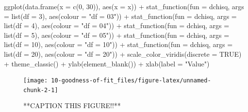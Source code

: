 \documentclass[
]{book}
\newenvironment{Shaded}{\begin{snugshade}}{\end{snugshade}}
\newcommand{\AttributeTok}[1]{\textcolor[rgb]{0.77,0.63,0.00}{#1}}
\newcommand{\ConstantTok}[1]{\textcolor[rgb]{0.00,0.00,0.00}{#1}}
\newcommand{\DecValTok}[1]{\textcolor[rgb]{0.00,0.00,0.81}{#1}}
\newcommand{\FunctionTok}[1]{\textcolor[rgb]{0.00,0.00,0.00}{#1}}
\newcommand{\NormalTok}[1]{#1}
\newcommand{\SpecialCharTok}[1]{\textcolor[rgb]{0.00,0.00,0.00}{#1}}
\newcommand{\StringTok}[1]{\textcolor[rgb]{0.31,0.60,0.02}{#1}}
\begin{document}
\begin{Shaded}
\begin{Highlighting}[]
\FunctionTok{ggplot}\NormalTok{(}\FunctionTok{data.frame}\NormalTok{(}\AttributeTok{x =} \FunctionTok{c}\NormalTok{(}\DecValTok{0}\NormalTok{, }\DecValTok{30}\NormalTok{)), }\FunctionTok{aes}\NormalTok{(}\AttributeTok{x =}\NormalTok{ x)) }\SpecialCharTok{+}
  \FunctionTok{stat\_function}\NormalTok{(}\AttributeTok{fun =}\NormalTok{ dchisq, }\AttributeTok{args =} \FunctionTok{list}\NormalTok{(}\AttributeTok{df =} \DecValTok{3}\NormalTok{), }\FunctionTok{aes}\NormalTok{(}\AttributeTok{colour =} \StringTok{"df = 03"}\NormalTok{)) }\SpecialCharTok{+}
  \FunctionTok{stat\_function}\NormalTok{(}\AttributeTok{fun =}\NormalTok{ dchisq, }\AttributeTok{args =} \FunctionTok{list}\NormalTok{(}\AttributeTok{df =} \DecValTok{4}\NormalTok{), }\FunctionTok{aes}\NormalTok{(}\AttributeTok{colour =} \StringTok{"df = 04"}\NormalTok{)) }\SpecialCharTok{+}
  \FunctionTok{stat\_function}\NormalTok{(}\AttributeTok{fun =}\NormalTok{ dchisq, }\AttributeTok{args =} \FunctionTok{list}\NormalTok{(}\AttributeTok{df =} \DecValTok{5}\NormalTok{), }\FunctionTok{aes}\NormalTok{(}\AttributeTok{colour =} \StringTok{"df = 05"}\NormalTok{)) }\SpecialCharTok{+}
  \FunctionTok{stat\_function}\NormalTok{(}\AttributeTok{fun =}\NormalTok{ dchisq, }\AttributeTok{args =} \FunctionTok{list}\NormalTok{(}\AttributeTok{df =} \DecValTok{10}\NormalTok{), }\FunctionTok{aes}\NormalTok{(}\AttributeTok{colour =} \StringTok{"df = 10"}\NormalTok{)) }\SpecialCharTok{+}
  \FunctionTok{stat\_function}\NormalTok{(}\AttributeTok{fun =}\NormalTok{ dchisq, }\AttributeTok{args =} \FunctionTok{list}\NormalTok{(}\AttributeTok{df =} \DecValTok{20}\NormalTok{), }\FunctionTok{aes}\NormalTok{(}\AttributeTok{colour =} \StringTok{"df = 20"}\NormalTok{)) }\SpecialCharTok{+}
  \FunctionTok{scale\_color\_viridis}\NormalTok{(}\AttributeTok{discrete =} \ConstantTok{TRUE}\NormalTok{) }\SpecialCharTok{+}
  \FunctionTok{theme\_classic}\NormalTok{() }\SpecialCharTok{+}
  \FunctionTok{ylab}\NormalTok{(}\FunctionTok{element\_blank}\NormalTok{()) }\SpecialCharTok{+}
  \FunctionTok{xlab}\NormalTok{(}\AttributeTok{label =} \StringTok{"Value"}\NormalTok{)}
\end{Highlighting}
\end{Shaded}

\begin{figure}

{\centering \texttt{[image: 10-goodness-of-fit\_files/figure-latex/unnamed-chunk-2-1]} 

}

\caption{**CAPTION THIS FIGURE!!**}\label{fig:unnamed-chunk-2}
\end{figure}
\end{document}
